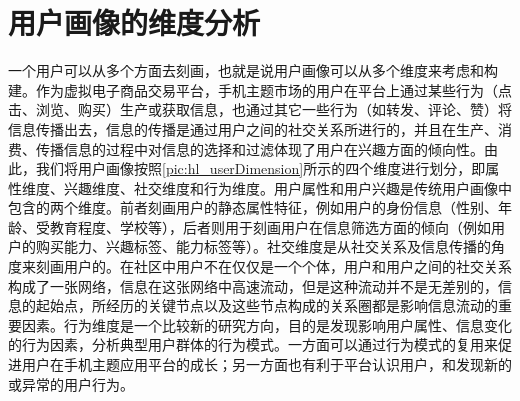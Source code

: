     \section{用户画像的维度分析}
    一个用户可以从多个方面去刻画，也就是说用户画像可以从多个维度来考虑和构建。作为虚拟电子商品交易平台，手机主题市场的用户在平台上通过某些行为（点击、浏览、购买）生产或获取信息，也通过其它一些行为（如转发、评论、赞）将信息传播出去，信息的传播是通过用户之间的社交关系所进行的，并且在生产、消费、传播信息的过程中对信息的选择和过滤体现了用户在兴趣方面的倾向性。由此，我们将用户画像按照\autoref{pic:hl_userDimension}所示的四个维度进行划分，即属性维度、兴趣维度、社交维度和行为维度。用户属性和用户兴趣是传统用户画像中包含的两个维度。前者刻画用户的静态属性特征，例如用户的身份信息（性别、年龄、受教育程度、学校等），后者则用于刻画用户在信息筛选方面的倾向（例如用户的购买能力、兴趣标签、能力标签等）。社交维度是从社交关系及信息传播的角度来刻画用户的。在社区中用户不在仅仅是一个个体，用户和用户之间的社交关系构成了一张网络，信息在这张网络中高速流动，但是这种流动并不是无差别的，信息的起始点，所经历的关键节点以及这些节点构成的关系圈都是影响信息流动的重要因素。行为维度是一个比较新的研究方向，目的是发现影响用户属性、信息变化的行为因素，分析典型用户群体的行为模式。一方面可以通过行为模式的复用来促进用户在手机主题应用平台的成长；另一方面也有利于平台认识用户，和发现新的或异常的用户行为。    
    \begin{figure}
    \centering
      \label{pic:hl_userDimension}
    \end{figure}

